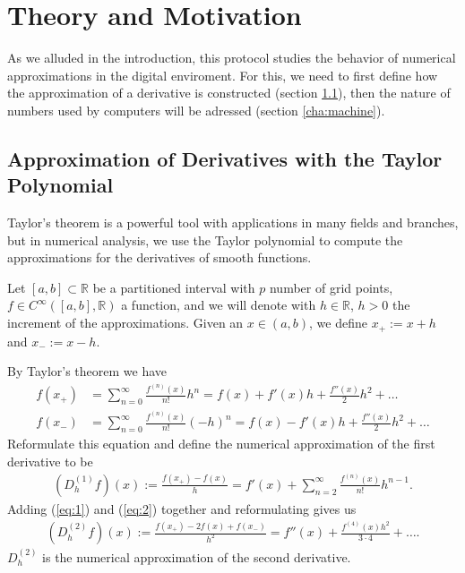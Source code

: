 \section{Theory and Motivation}
As we alluded in the introduction, this protocol studies the behavior of numerical approximations in the digital enviroment. For this, we need to first define how the approximation of a derivative is constructed (section \ref{chap:approximation}), then the nature of numbers used by computers will be adressed (section \ref{cha:machine}).
%
\subsection{Approximation of Derivatives with the Taylor Polynomial} \label{chap:approximation}
Taylor's theorem is a powerful tool with applications in many fields and branches, but in numerical analysis, we use the Taylor polynomial to compute the approximations for the derivatives of smooth functions.

Let \([a, b] \subset \mathbb{R}\) be a partitioned interval with \(p\) number of grid points, \(f \in C^{\infty}([a, b], \mathbb{R})\) a function, and we will denote with \(h \in \mathbb{R}\), \(h > 0\) the increment of the approximations. Given an \(x \in (a, b)\), we define \(x_{+} := x + h\) and \(x_{-} := x - h\).

By Taylor's theorem \cite{H.Amann} we have
\begin{align}
    f(x_{+}) &= \sum^{\infty}_{n = 0} \frac{f^{(n)}(x)}{n!} h^n = f(x) + f'(x)h + \frac{f''(x)}{2}h^2 + \dots \label{eq:1}\\
    f(x_{-}) &= \sum^{\infty}_{n = 0} \frac{f^{(n)}(x)}{n!} (-h)^n = f(x) - f'(x)h + \frac{f''(x)}{2}h^2 + \dots \label{eq:2}
\end{align}
Reformulate this equation and define the numerical approximation of the first derivative to be
\begin{align*}
    (D^{(1)}_h f) (x) := \frac{f(x_{+}) - f(x)}{h} = f'(x) + \sum^{\infty}_{n = 2} \frac{f^{(n)} (x)}{n!}h^{n-1} \text{.}
\end{align*}
Adding (\ref{eq:1}) and (\ref{eq:2}) together and reformulating gives us
\begin{align*}
    (D^{(2)}_h f)(x) := \frac{f(x_{+}) - 2f(x) + f(x_{-})}{h^2} = f''(x) + \frac{f^{(4)}(x)h^2}{3 \cdot 4} + \dots \text{.}
\end{align*}
\(D^{(2)}_h\) is the numerical approximation of the second derivative.

